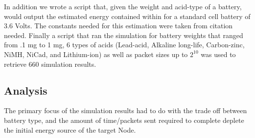 In addition we wrote a script that, given the weight and acid-type of a battery, would output the estimated energy contained within for
a standard cell battery of 3.6 Volts. The constants needed for this estimation were taken from {citation needed}. Finally a script that 
ran the simulation for battery weights that ranged from .1 mg to 1 mg, 6 types of acids (Lead-acid, Alkaline long-life, Carbon-zinc, 
NiMH, NiCad, and Lithium-ion) as well as packet sizes up to $2^{10}$ was used to retrieve 660 simulation results. 

\subsection{Analysis}
The primary focus of the simulation results had to do with the trade off between battery type, and the amount of time/packets sent
required to complete deplete the initial energy source of the target Node. 